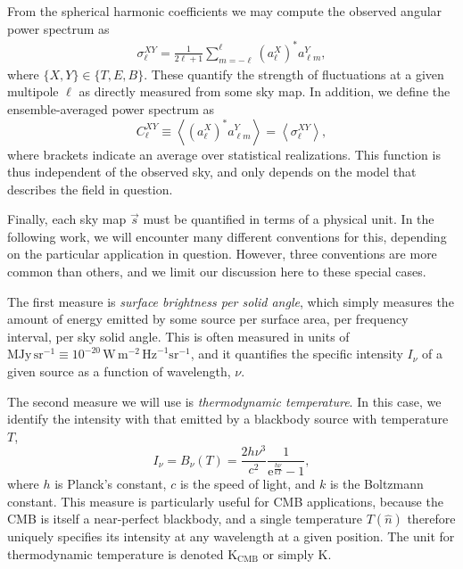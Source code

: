 \documentclass[onecolumn]{aa}
\newcommand{\s}[0]{\vec{s}}
\newcommand{\e}{\mathrm e}
\begin{document}
From the spherical harmonic coefficients we may compute the observed
angular power spectrum as
\begin{align}
\sigma_{\ell}^{XY} = \frac{1}{2\ell+1} \sum_{m=-\ell}^{\ell} \left(a_{\ell}^X\right)^*
a_{\ell m}^Y,
\label{eq:sigmal}
\end{align}
where $\{X,Y\} \in \{T,E,B\}$. These quantify the strength of
fluctuations at a given multipole $\ell$ as directly measured from
some sky map. In addition, we define the ensemble-averaged power
spectrum as
\begin{equation}
C_{\ell}^{XY} \equiv \left<\left(a_{\ell}^X\right)^* a_{\ell m}^Y \right> = \left<
\sigma_{\ell}^{XY} \right>,
\end{equation}
where brackets indicate an average over statistical realizations. This
function is thus independent of the observed sky, and only depends on
the model that describes the field in question. 

Finally, each sky map $\s$ must be quantified in terms of a physical
unit. In the following work, we will encounter many different
conventions for this, depending on the particular application in
question. However, three conventions are more common than others, and
we limit our discussion here to these special cases.

The first measure is \emph{surface brightness per solid angle}, which
simply measures the amount of energy emitted by some source per
surface area, per frequency interval,  per sky solid angle. This is often
measured in units of ${\textrm{MJy}\,\textrm{sr}^{-1} \equiv
10^{-20}\,\textrm{W}\,\textrm{m}^{-2}\,\textrm{Hz}^{-1}\textrm{sr}^{-1}}$,
and it quantifies the specific intensity $I_{\nu}$ of a given source as a
function of wavelength, $\nu$.

The second measure we will use is \emph{thermodynamic temperature}. In
this case, we identify the intensity with that emitted by a blackbody
source with temperature $T$,
\begin{equation}
  I_{\nu} = B_{\nu}(T) =
  \frac{2h\nu^3}{c^2}\frac{1}{\e^{\frac{h\nu}{kT}}-1},
  \label{eq:T_thermo}
\end{equation}
where $h$ is Planck's constant, $c$ is the speed of light, and $k$ is
the Boltzmann constant. This measure is particularly useful for CMB
applications, because the CMB is itself a near-perfect blackbody, and
a single temperature $T(\hat{n})$ therefore uniquely specifies its
intensity at any wavelength at a given position. The unit for
thermodynamic temperature is denoted $\textrm{K}_{\mathrm{CMB}}$ or
simply $\mathrm{K}$. 
\end{document}

